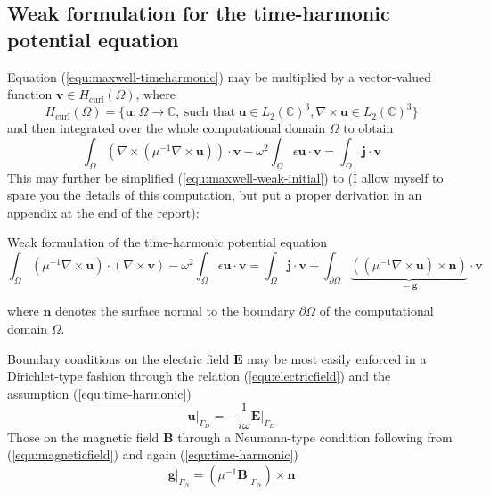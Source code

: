\documentclass[11pt, a4paper]{article}
\begin{document}
\subsection{Weak formulation for the time-harmonic potential equation}
\label{subsec:maxwell-weak}

Equation (\ref{equ:maxwell-timeharmonic}) may be multiplied by a vector-valued
function $\mathbf{v} \in H_{\textrm{curl}}(\Omega)$, where
\begin{equation}
    H_{\textrm{curl}}(\Omega) = \{\mathbf{u} : \Omega \to \mathbb{C},~\text{such that}~\mathbf{u}\in L_2(\mathbb{C})^3, \nabla \times \mathbf{u} \in L_2(\mathbb{C})^3\} \label{equ:h-curl}
\end{equation}
and then integrated over the whole computational domain $\Omega$ to obtain 
\begin{equation}
    \int_{\Omega} (\nabla \times ({\mu^{-1} \nabla \times \mathbf{u}})) \cdot \mathbf{v}
    - \omega^2 \int_{\Omega} \epsilon \mathbf{u} \cdot \mathbf{v} = \int_{\Omega} \mathbf{j} \cdot \mathbf{v} \label{equ:maxwell-weak-initial}
\end{equation}
This may further be simplified (\ref{equ:maxwell-weak-initial}) to (I allow myself
to spare you the details of this computation, but put a proper derivation
in an appendix at the end of the report):
\begin{fancybox}{Weak formulation of the time-harmonic potential equation}
    \begin{equation}
        \int_{\Omega} ({\mu^{-1} \nabla \times \mathbf{u}}) \cdot (\nabla \times \mathbf{v})
        - \omega^2 \int_{\Omega} \epsilon \mathbf{u} \cdot \mathbf{v} 
        = \int_{\Omega} \mathbf{j} \cdot \mathbf{v}
        + \int_{\partial \Omega} \underbrace{(({\mu^{-1} \nabla \times \mathbf{u}}) \times \mathbf{n})}_{= \mathbf{g}} \cdot \mathbf{v}
        \label{equ:maxwell-weak}
    \end{equation}
\end{fancybox}
where $\mathbf{n}$ denotes the surface normal to the boundary $\partial \Omega$
of the computational domain $\Omega$.

Boundary conditions on the electric field $\mathbf{E}$ may be most easily enforced
in a Dirichlet-type fashion through the relation (\ref{equ:electricfield}) and
the assumption (\ref{equ:time-harmonic})
\begin{equation}
    \left.\mathbf{u}\right|_{\Gamma_D} = -\frac{1}{i\omega} \left.\mathbf{E}\right|_{\Gamma_D} \label{equ:dirichlet-boundary}
\end{equation}
Those on the magnetic field $\mathbf{B}$ through a Neumann-type condition following
from (\ref{equ:magneticfield}) and again (\ref{equ:time-harmonic})
\begin{equation}
    \left.\mathbf{g}\right|_{\Gamma_N} = (\mu^{-1} \left.\mathbf{B}\right|_{\Gamma_N}) \times \mathbf{n} \label{equ:neumann-boundary}
\end{equation}
\end{document}
